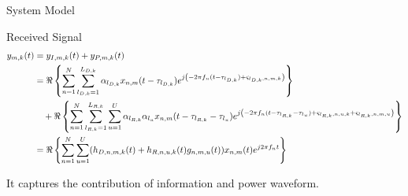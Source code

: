 \documentclass{IEEEtran}
\begin{document}
\begin{section} {System Model}
\begin{subsection} {Received Signal}
            \begin{equation} \label{eq:y_{m,k}(t)}
                \begin{split}
                    y_{m,k}(t)
                    &= y_{I,m,k}(t)+y_{P,m,k}(t) \\
                    &= \Re \left\{ \sum_{n=1}^{N} \sum_{l_{D,k}=1}^{L_{D,k}} \alpha_{l_{D,k}} x_{n,m}(t-\tau_{l_{D,k}}) e^{j \left( -2 \pi f_n (t-\tau_{l_{D,k}})+\varsigma_{l_{D,k},n,m,k}\right) } \right\} \\
                    &\quad+ \Re \left\{ \sum_{n=1}^{N} \sum_{l_{R,k}=1}^{L_{R,k}} \sum_{u=1}^{U} \alpha_{l_{R,k}} \alpha_{l_u} x_{n,m}(t-\tau_{l_{R,k}}-\tau_{l_u}) e^{j \left( -2 \pi f_n (t-\tau_{l_{R,k}}-\tau_{l_u})+\varsigma_{l_{R,k},n,u,k}+\varsigma_{l_{R,k},n,m,u}\right)} \right\} \\
                    &= \Re \left\{ \sum_{n=1}^{N} \sum_{u=1}^{U} (h_{D,n,m,k}(t)+h_{R,n,u,k}(t)g_{n,m,u}(t)) x_{n,m}(t) e^{j2 \pi f_n t} \right\}
                \end{split}
            \end{equation}

            It captures the contribution of information and power waveform.
        \end{subsection}
    \end{section}

    
    
\end{document}
